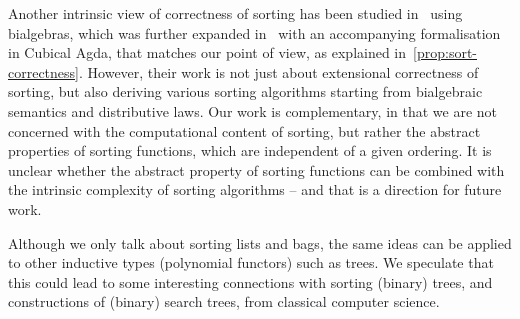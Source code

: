 Another intrinsic view of correctness of sorting has been studied in~\cite{hinzeSortingBialgebrasDistributive2012}
using bialgebras, which was further expanded in~\cite{alexandruIntrinsicallyCorrectSorting2023} with an accompanying formalisation in Cubical Agda,
that matches our point of view, as explained in~\cref{prop:sort-correctness}.
%
However, their work is not just about extensional correctness of sorting,
but also deriving various sorting algorithms starting from bialgebraic semantics and distributive laws.
%
Our work is complementary, in that we are not concerned with the computational content of sorting, but rather
the abstract properties of sorting functions, which are independent of a given ordering.
%
It is unclear whether the abstract property of sorting functions can be combined
with the intrinsic complexity of sorting algorithms --
and that is a direction for future work.

Although we only talk about sorting lists and bags,
the same ideas can be applied to other inductive types (polynomial functors) such as trees.
%
We speculate that this could lead to some interesting connections with sorting
(binary) trees, and constructions of (binary) search trees, from classical computer science.
